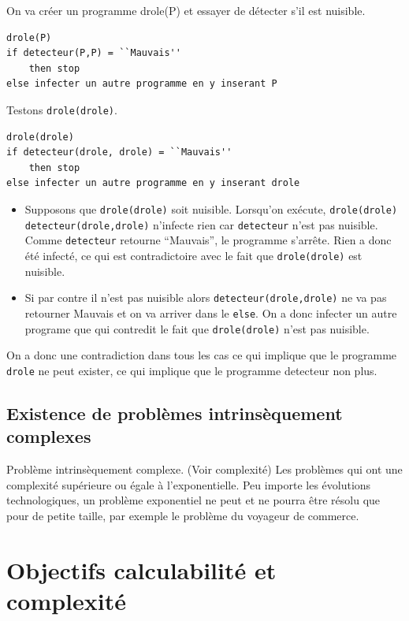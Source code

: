 On va créer un programme drole(P) et essayer de détecter s’il est nuisible.

\label{lst:detecteur_de_virus}
\begin{lstlisting}
drole(P)
if detecteur(P,P) = ``Mauvais''
	then stop
else infecter un autre programme en y inserant P
\end{lstlisting}

Testons \lstinline|drole(drole)|.
\begin{lstlisting}
drole(drole)
if detecteur(drole, drole) = ``Mauvais''
	then stop
else infecter un autre programme en y inserant drole
\end{lstlisting}

\begin{itemize}
	\item Supposons que \lstinline|drole(drole)| soit nuisible.
      Lorsqu'on exécute, \lstinline|drole(drole)|
      \lstinline|detecteur(drole,drole)| n'infecte rien car \lstinline|detecteur| n'est pas nuisible.
      Comme \lstinline|detecteur| retourne ``Mauvais'',
      le programme s'arrête.
      Rien a donc été infecté, ce qui est contradictoire avec le fait que \lstinline|drole(drole)| est nuisible.
	\item Si par contre il n'est pas nuisible alors \lstinline|detecteur(drole,drole)|
      ne va pas retourner Mauvais et on va arriver dans le \lstinline|else|.
      On a donc infecter un autre programe que qui contredit le fait que \lstinline|drole(drole)| n'est pas nuisible.
\end{itemize}

On a donc une contradiction dans tous les cas ce qui implique que le programme \lstinline|drole| ne peut
exister, ce qui implique que le programme detecteur non plus.

\subsection{ Existence de problèmes intrinsèquement complexes}
	Problème intrinsèquement complexe. (Voir complexité) Les problèmes
		qui ont une complexité supérieure ou égale à l'exponentielle. Peu importe les évolutions technologiques, un problème exponentiel ne peut et ne pourra être résolu que pour de petite taille, par exemple le problème du voyageur de commerce. 
		
\section{Objectifs calculabilité et complexité}

